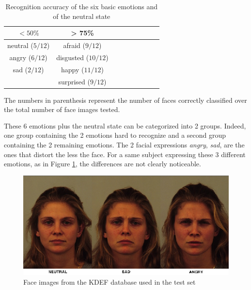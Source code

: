 \begin{table}[h]
   \caption{\label{table_results_accuracy} Recognition accuracy of the six basic emotions and of the neutral state}
\begin{tabular}{|c|c|c|c|c|c|c|c|c|}
  \hline
   $ < 50\% $ & > 75\% \\
  \hline
  neutral ($ 5/12 $) & afraid ($ 9/12 $) \\
  angry ($ 6/12 $) & disgusted ($ 10/12 $) \\
  sad ($ 2/12 $) & happy ($ 11/12 $) \\
   & surprised ($ 9/12 $) \\
  \hline
\end{tabular}
\end{table}

\noindent The numbers in parenthesis represent the number of faces correctly classified over the total number of face images tested.
\newline

\noindent These 6 emotions plus the neutral state can be categorized into 2 groups. Indeed, one group containing the 2 emotions hard to recognize and a second group containing the 2 remaining emotions. The 2 facial expressions \textit{angry}, \textit{sad}, are the ones that distort the less the face. For a same subject expressing these 3 different emotions, as in Figure \ref{kdef_no_difference_emotions}, the differences are not clearly noticeable.
\newline

\begin{figure}[!h]
\begin{center}
\noindent \includegraphics[scale=0.3]{figures/kdef_no_difference_emotions} 
\newline
\caption{Face images from the KDEF database used in the test set}
\label{kdef_no_difference_emotions}
\end{center} 
\end{figure}

